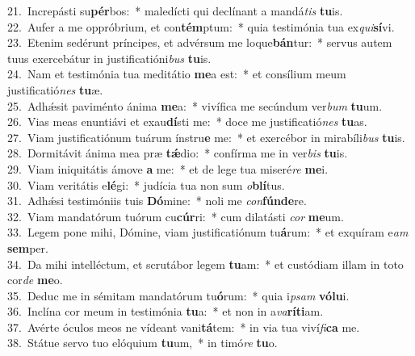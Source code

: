 {21.~}Increpásti su\textbf{pér}bos:~* maledícti qui declínant a mandá\textit{tis} \textbf{tu}is.\\
{22.~}Aufer a me oppróbrium, et con\textbf{tém}ptum:~* quia testimónia tua ex\textit{qui}\textbf{sí}vi.\\
{23.~}Etenim sedérunt príncipes, et advérsum me loque\textbf{bán}tur:~* servus autem tuus exercebátur in justificatióni\textit{bus} \textbf{tu}is.\\
{24.~}Nam et testimónia tua meditátio \textbf{me}a est:~* et consílium meum justificatió\textit{nes} \textbf{tu}æ.\\
{25.~}Adhǽsit paviménto ánima \textbf{me}a:~* vivífica me secúndum ver\textit{bum} \textbf{tu}um.\\
{26.~}Vias meas enuntiávi et exau\textbf{dí}sti me:~* doce me justificatió\textit{nes} \textbf{tu}as.\\
{27.~}Viam justificatiónum tuárum ínstru\textbf{e} me:~* et exercébor in mirabíli\textit{bus} \textbf{tu}is.\\
{28.~}Dormitávit ánima mea præ \textbf{tǽ}dio:~* confírma me in ver\textit{bis} \textbf{tu}is.\\
{29.~}Viam iniquitátis ámove \textbf{a} me:~* et de lege tua miseré\textit{re} \textbf{me}i.\\
{30.~}Viam veritátis e\textbf{lé}gi:~* judícia tua non sum \textit{o}\textbf{blí}tus.\\
{31.~}Adhǽsi testimóniis tuis \textbf{Dó}mine:~* noli me \textit{con}\textbf{fún}\textbf{de}re.\\
{32.~}Viam mandatórum tuórum cu\textbf{cúr}ri:~* cum dilatásti \textit{cor} \textbf{me}um.\\
{33.~}Legem pone mihi, Dómine, viam justificatiónum tu\textbf{á}rum:~* et exquíram e\textit{am} \textbf{sem}per.\\
{34.~}Da mihi intelléctum, et scrutábor legem \textbf{tu}am:~* et custódiam illam in toto cor\textit{de} \textbf{me}o.\\
{35.~}Deduc me in sémitam mandatórum tu\textbf{ó}rum:~* quia i\textit{psam} \textbf{vó}\textbf{lu}i.\\
{36.~}Inclína cor meum in testimónia \textbf{tu}a:~* et non in a\textit{va}\textbf{rí}\textbf{ti}am.\\
{37.~}Avérte óculos meos ne vídeant vani\textbf{tá}tem:~* in via tua viví\textit{fi}\textbf{ca} me.\\
{38.~}Státue servo tuo elóquium \textbf{tu}um,~* in timó\textit{re} \textbf{tu}o.\\
